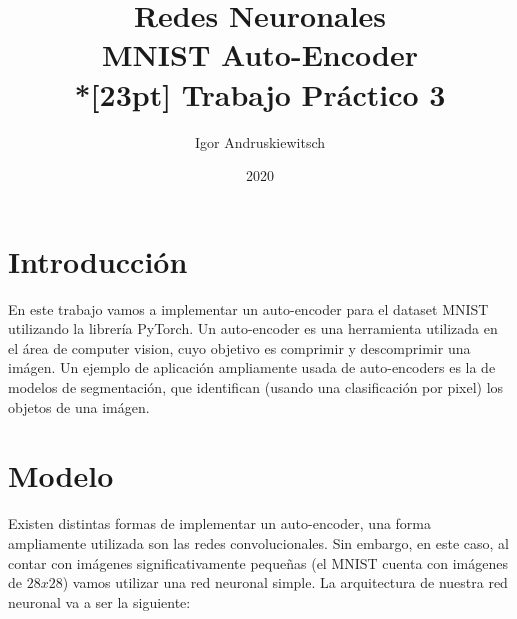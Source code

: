 \documentclass [a4paper,12pt,oneside,final]{article}
\title{%
Redes Neuronales \\
MNIST Auto-Encoder \\*[23pt]
Trabajo Práctico 3 \\
}
\date{2020}
\author{Igor Andruskiewitsch}
\begin{document}
    \maketitle

\section{Introducción}

En este trabajo vamos a implementar un auto-encoder para el dataset MNIST utilizando la librería PyTorch. Un auto-encoder es una herramienta utilizada en el área de computer vision, cuyo objetivo es comprimir y descomprimir una imágen. Un ejemplo de aplicación ampliamente usada de auto-encoders es la de modelos de segmentación, que identifican (usando una clasificación por pixel) los objetos de una imágen.

\section{Modelo}

Existen distintas formas de implementar un auto-encoder, una forma ampliamente utilizada son las redes convolucionales. Sin embargo, en este caso, al contar con imágenes significativamente pequeñas (el MNIST cuenta con imágenes de $28x28$) vamos utilizar una red neuronal simple. La arquitectura de nuestra red neuronal va a ser la siguiente:
\end{document}
